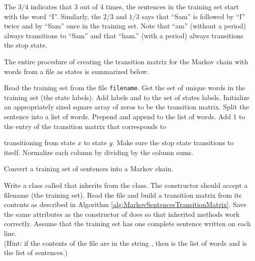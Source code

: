 The $3/4$ indicates that 3 out of 4 times, the sentences in the training set start with the word ``I''.
Similarly, the $2/3$ and $1/3$ says that ``Sam'' is followed by ``I'' twice and by ``Sam'' once in the training set.
Note that ``am'' (without a period) always transitions to ``Sam'' and that ``ham.'' (with a period) always transitions the stop state.

The entire procedure of creating the transition matrix for the Markov chain with words from a file as states is summarized below.

\begin{algorithm}[H] %
\begin{algorithmic}[1]
\State Read the training set from the file \texttt{filename}.
\State Get the set of unique words in the training set (the state labels).
\State Add labels  and  to the set of states labels.
\State Initialize an appropriately sized square array of zeros to be the transition matrix.
    \State Split the sentence into a list of words.
    \State Prepend  and append  to the list of words.
    \State Add 1 to the entry of the transition matrix that corresponds to \par\qquad\qquad transitioning from state $x$ to state $y$.
    \EndFor
\EndFor
\State Make sure the stop state transitions to itself.
\State Normalize each column by dividing by the column sums.
\EndProcedure
\end{algorithmic}
\caption{Convert a training set of sentences into a Markov chain.}
\label{alg:MarkovSentencesTransitionMatrix}
\end{algorithm}

\begin{problem} %
\label{prob:markov-random-sentences-init}
Write a class called  that inherits from the  class.
The constructor should accept a filename (the training set).
Read the file and build a transition matrix from its contents as described in Algorithm \ref{alg:MarkovSentencesTransitionMatrix}.
Save the same attributes as the constructor of  does so that inherited methods work correctly.
Assume that the training set has one complete sentence written on each line.
\\(Hint: if the contents of the file are in the string , then  is the list of words and  is the list of sentences.)
\end{problem}


